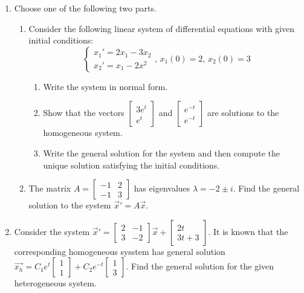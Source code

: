 \begin{enumerate}[label=\arabic*.]
\begin{enumerate}[label=(\alph*)]
		\end{enumerate}
	\item
		Choose one of the following two parts.
		\begin{enumerate}[label=(\alph*)]
			\item 
				Consider the following linear system of differential equations with given initial conditions:
				\begin{equation*}
					\begin{cases}
						x_1' = 2x_1 - 3x_2 \\
						x_2' = x_1 - 2x^2
					\end{cases} \text{, } x_1(0)=2 \text{, } x_2(0)=3
				\end{equation*}
				\begin{enumerate}[label=(\roman*)]
					\item
						Write the system in normal form.
					\item
						Show that the vectors $\begin{bmatrix}
							3e^t \\
							e^t
						\end{bmatrix}$ and $\begin{bmatrix}
							e^{-t} \\
							e^{-t} 
						\end{bmatrix}$ are solutions to the homogeneous system.
					\item
						Write the general solution for the system and then compute the unique solution satisfying the initial conditions.
				\end{enumerate}
			\item
				The matrix $A = \begin{bmatrix}
					-1 & 2 \\
					-1 & 3
				\end{bmatrix}$ has eigenvalues $\lambda = -2 \pm i$. Find the general solution to the system $\vec{x}' = A\vec{x}$.
		\end{enumerate}
	\item
		Consider the system $\vec{x}' = \begin{bmatrix}
			2 & -1 \\
			3 & -2
		\end{bmatrix}\vec{x} + \begin{bmatrix}
			2t \\
			3t + 3
		\end{bmatrix}$. It is known that the corresponding homogeneous sysstem has general solution $\vec{x_h} = C_1e^t\begin{bmatrix}
			1 \\
			1
		\end{bmatrix} + C_2e^{-t}\begin{bmatrix}
			1 \\
			3
		\end{bmatrix}$. Find the general solution for the given heterogeneous system.
\end{enumerate}